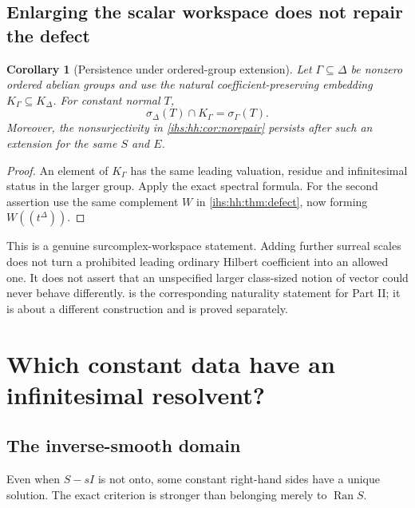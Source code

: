 \documentclass[11pt,a4paper]{article}
\numberwithin{equation}{section}
\newtheorem{corollary}[corollary]{Corollary}
\theoremstyle{definition}
\theoremstyle{remark}
\newcommand{\Ran}{\operatorname{Ran}}
\begin{document}
\subsection{Enlarging the scalar workspace does not repair the defect}\label{ihs:hh:sec:extension}
\begin{corollary}[Persistence under ordered-group extension]\label{ihs:hh:cor:extension}
Let $\Gamma\subseteq\Delta$ be nonzero ordered abelian groups and use the natural
coefficient-preserving embedding $K_\Gamma\subseteq K_\Delta$. For constant
normal $T$,
\[
 \sigma_\Delta(T)\cap K_\Gamma=\sigma_\Gamma(T).
\]
Moreover, the nonsurjectivity in \cref{ihs:hh:cor:norepair} persists after
such an extension for the same $S$ and $E$.
\end{corollary}
\begin{proof}
An element of $K_\Gamma$ has the same leading valuation, residue and
infinitesimal status in the larger group. Apply the exact spectral formula.
For the second assertion use the same complement $W$ in
\cref{ihs:hh:thm:defect}, now forming $W((t^\Delta))$.
\end{proof}

This is a genuine surcomplex-workspace statement. Adding further surreal
scales does not turn a prohibited leading ordinary Hilbert coefficient into
an allowed one. It does not assert that an unspecified larger class-sized
notion of vector could never behave differently.
 is the corresponding naturality statement for
Part II; it is about a different construction and is proved separately.

\section{Which constant data have an infinitesimal resolvent?}\label{ihs:hh:sec:resolventdata}

\subsection{The inverse-smooth domain}\label{ihs:hh:sec:smooth}
Even when $S-sI$ is not onto, some constant right-hand sides have a unique
solution. The exact criterion is stronger than belonging merely to $\Ran S$.
\end{document}
